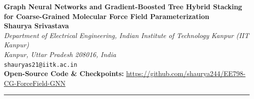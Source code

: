 \documentclass[11pt,a4paper]{article}
\begin{document}
\begin{center}
    {\Large \bfseries Graph Neural Networks and Gradient-Boosted Tree Hybrid Stacking for Coarse-Grained Molecular Force Field Parameterization} \\[2.0ex]
    
    \textbf{Shaurya Srivastava} \\[0.8ex]
    \textit{Department of Electrical Engineering, Indian Institute of Technology Kanpur (IIT Kanpur)} \\
    \textit{Kanpur, Uttar Pradesh 208016, India} \\
    \texttt{shauryas21@iitk.ac.in} \\[1.5ex]
    
    \textbf{Open-Source Code \& Checkpoints:} \url{https://github.com/shaurya244/EE798-CG-ForceField-GNN} \\[1.5ex]
    \rule{\textwidth}{0.8pt}
\end{center}

\vspace{-0.5em}
\end{document}
